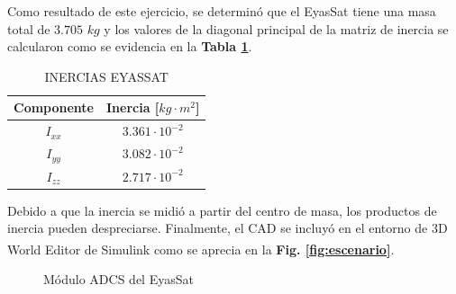 Como resultado de este ejercicio, se determinó que el EyasSat tiene una masa total de $3.705$ $kg$ y los valores de la diagonal principal de la matriz de inercia se calcularon como se evidencia en la \textbf{Tabla \ref{table:inercia_eyassat}}.
\begin{table}[h]
	\caption{\MakeUppercase{Inercias EyasSat}}
	\begin{center}
		\begin{tabular}{ c|c}
			\hline
			Componente & Inercia [$kg\cdot m^2$] \\ \hline
			$I_{xx}$ &  $3.361\cdot10^{-2}$ \\ \hline
			$I_{yy}$ &  $3.082\cdot10^{-2}$ \\ \hline
			$I_{zz}$ &  $2.717\cdot10^{-2}$ \\ \hline
	
		\end{tabular}
	\end{center}
	\label{table:inercia_eyassat}
\end{table}

Debido a que la inercia se midió a partir del centro de masa, los productos de inercia pueden despreciarse. Finalmente, el CAD se incluyó en el entorno de 3D World Editor de Simulink\textsuperscript{\tiny\textregistered} como se aprecia en la \textbf{Fig. \ref{fig:escenario}}.


\begin{figure}[h!]
	\centering
	
	\caption{Módulo ADCS del EyasSat}
	\label{fig:mediciones}
\end{figure}


